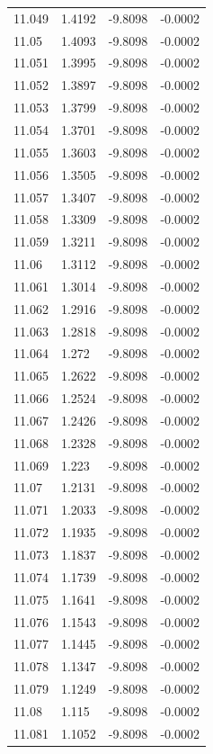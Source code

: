 \begin{tabular}{llll}
11.049 & 1.4192 & -9.8098 & -0.0002 \\
11.05 & 1.4093 & -9.8098 & -0.0002 \\
11.051 & 1.3995 & -9.8098 & -0.0002 \\
11.052 & 1.3897 & -9.8098 & -0.0002 \\
11.053 & 1.3799 & -9.8098 & -0.0002 \\
11.054 & 1.3701 & -9.8098 & -0.0002 \\
11.055 & 1.3603 & -9.8098 & -0.0002 \\
11.056 & 1.3505 & -9.8098 & -0.0002 \\
11.057 & 1.3407 & -9.8098 & -0.0002 \\
11.058 & 1.3309 & -9.8098 & -0.0002 \\
11.059 & 1.3211 & -9.8098 & -0.0002 \\
11.06 & 1.3112 & -9.8098 & -0.0002 \\
11.061 & 1.3014 & -9.8098 & -0.0002 \\
11.062 & 1.2916 & -9.8098 & -0.0002 \\
11.063 & 1.2818 & -9.8098 & -0.0002 \\
11.064 & 1.272 & -9.8098 & -0.0002 \\
11.065 & 1.2622 & -9.8098 & -0.0002 \\
11.066 & 1.2524 & -9.8098 & -0.0002 \\
11.067 & 1.2426 & -9.8098 & -0.0002 \\
11.068 & 1.2328 & -9.8098 & -0.0002 \\
11.069 & 1.223 & -9.8098 & -0.0002 \\
11.07 & 1.2131 & -9.8098 & -0.0002 \\
11.071 & 1.2033 & -9.8098 & -0.0002 \\
11.072 & 1.1935 & -9.8098 & -0.0002 \\
11.073 & 1.1837 & -9.8098 & -0.0002 \\
11.074 & 1.1739 & -9.8098 & -0.0002 \\
11.075 & 1.1641 & -9.8098 & -0.0002 \\
11.076 & 1.1543 & -9.8098 & -0.0002 \\
11.077 & 1.1445 & -9.8098 & -0.0002 \\
11.078 & 1.1347 & -9.8098 & -0.0002 \\
11.079 & 1.1249 & -9.8098 & -0.0002 \\
11.08 & 1.115 & -9.8098 & -0.0002 \\
11.081 & 1.1052 & -9.8098 & -0.0002 \\

\end{tabular}
